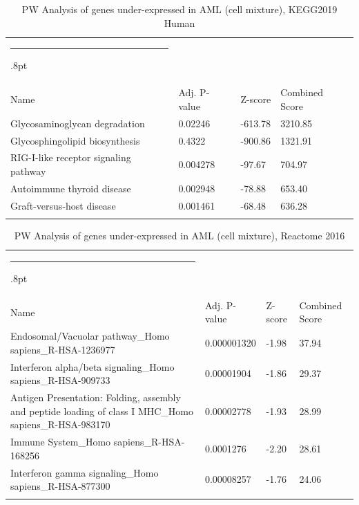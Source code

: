 \documentclass[3p,authoryear,preprint,12pt]{elsarticle}
\makeatletter
\def\hlinewd#1{%
  \noalign{\ifnum0=`}\fi\hrule \@height #1%
  \futurelet\reserved@a\@xhline}
\def\tbltoprule{\hlinewd{.8pt}\\[-12pt]}
\def\tblbottomrule{\noalign{\vspace*{6pt}}\hline\noalign{\vspace*{2pt}}}
\def\tblmidrule{\noalign{\vspace*{6pt}}\hline\noalign{\vspace*{2pt}}}
\makeatother
\begin{document}
\begin{table}[!htbp]
	\caption{{PW Analysis of genes under-expressed in AML (cell mixture), KEGG2019 Human} }
	\label{tw-de478ae31cm6}
	\def\arraystretch{1}
	\ignorespaces 
	\centering 
	\begin{tabulary}{\linewidth}{p{\dimexpr.65\tabcolsep}p{\dimexpr.15\tabcolsep}p{\dimexpr.1\tabcolsep}p{\dimexpr.1\tabcolsep}}
		\tbltoprule Name & Adj. P-value & Z-score & Combined Score\\
		\tblmidrule
Glycosaminoglycan degradation & 0.02246 & -613.78 & 3210.85 \\
Glycosphingolipid biosynthesis & 0.4322 & -900.86 & 1321.91 \\
RIG-I-like receptor signaling pathway & 0.004278 & -97.67 & 704.97 \\
Autoimmune thyroid disease & 0.002948 & -78.88 & 653.40 \\
Graft-versus-host disease & 0.001461 & -68.48 & 636.28 \\
		\tblbottomrule
	\end{tabulary}\par 
\end{table}
\begin{table}[!htbp]
	\caption{{PW Analysis of genes under-expressed in AML (cell mixture), Reactome 2016} }
	\label{tw-de478ae31cn6}
	\def\arraystretch{1}
	\ignorespaces 
	\centering 
	\begin{tabulary}{\linewidth}{p{\dimexpr.65\tabcolsep}p{\dimexpr.15\tabcolsep}p{\dimexpr.1\tabcolsep}p{\dimexpr.1\tabcolsep}}
		\tbltoprule Name & Adj. P-value & Z-score & Combined Score\\
		\tblmidrule
Endosomal/Vacuolar pathway\_Homo sapiens\_R-HSA-1236977 & 0.000001320 & -1.98 & 37.94 \\
Interferon alpha/beta signaling\_Homo sapiens\_R-HSA-909733 & 0.00001904 & -1.86 & 29.37 \\
Antigen Presentation: Folding, assembly and peptide loading of class I MHC\_Homo sapiens\_R-HSA-983170 & 0.00002778 & -1.93 & 28.99 \\
Immune System\_Homo sapiens\_R-HSA-168256 & 0.0001276 & -2.20 & 28.61 \\
Interferon gamma signaling\_Homo sapiens\_R-HSA-877300 & 0.00008257 & -1.76 & 24.06 \\
		\tblbottomrule
	\end{tabulary}\par 
\end{table}
\end{document}
